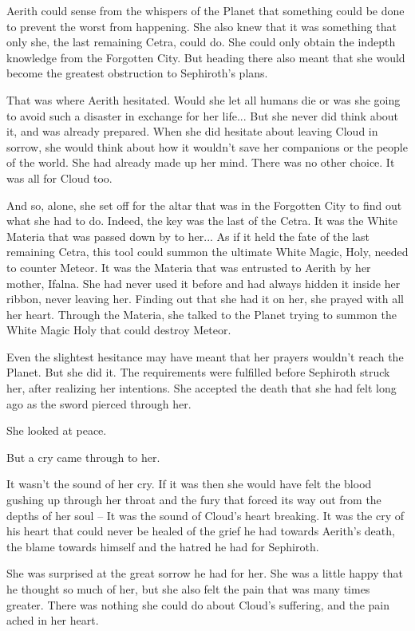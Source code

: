\documentclass[oneside]{book}
\begin{document}
Aerith could sense from the whispers of the Planet that something could be done to prevent the worst from happening. She also knew that it was something that only she, the last remaining Cetra, could do. She could only obtain the indepth knowledge from the Forgotten City. But heading there also meant that she would become the greatest obstruction to Sephiroth's plans.

That was where Aerith hesitated. Would she let all humans die or was she going to avoid such a disaster in exchange for her life... But she never did think about it, and was already prepared. When she did hesitate about leaving Cloud in sorrow, she would think about how it wouldn't save her companions or the people of the world. She had already made up her mind. There was no other choice. It was all for Cloud too.

And so, alone, she set off for the altar that was in the Forgotten City to find out what she had to do. Indeed, the key was the last of the Cetra. It was the White Materia that was passed down by to her... As if it held the fate of the last remaining Cetra, this tool could summon the ultimate White Magic, Holy, needed to counter Meteor. It was the Materia that was entrusted to Aerith by her mother, Ifalna. She had never used it before and had always hidden it inside her ribbon, never leaving her. Finding out that she had it on her, she prayed with all her heart. Through the Materia, she talked to the Planet trying to summon the White Magic Holy that could destroy Meteor.

Even the slightest hesitance may have meant that her prayers wouldn't reach the Planet. But she did it. The requirements were fulfilled before Sephiroth struck her, after realizing her intentions. She accepted the death that she had felt long ago as the sword pierced through her.

She looked at peace.

But a cry came through to her.

It wasn't the sound of her cry. If it was then she would have felt the blood gushing up through her throat and the fury that forced its way out from the depths of her soul – It was the sound of Cloud's heart breaking. It was the cry of his heart that could never be healed of the grief he had towards Aerith's death, the blame towards himself and the hatred he had for Sephiroth.

She was surprised at the great sorrow he had for her. She was a little happy that he thought so much of her, but she also felt the pain that was many times greater. There was nothing she could do about Cloud's suffering, and the pain ached in her heart.
\end{document}
